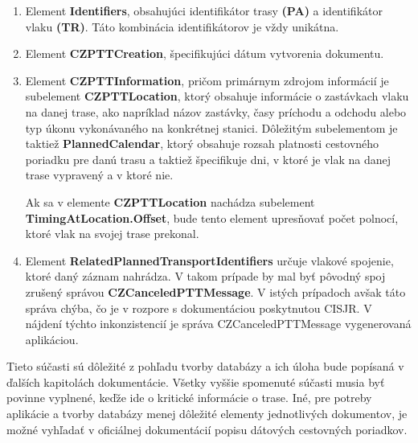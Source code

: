\documentclass[10pt,xcolor=pdflatex,dvipsnames,table,oneside]{book}
\begin{document}
\begin{enumerate}
    \item Element \textbf{Identifiers}, obsahujúci identifikátor trasy \textbf{(PA)} a identifikátor vlaku \textbf{(TR)}. Táto kombinácia identifikátorov je vždy unikátna.
    \item Element \textbf{CZPTTCreation}, špecifikujúci dátum vytvorenia dokumentu.
    \item Element \textbf{CZPTTInformation}, pričom primárnym zdrojom informácií je subelement \textbf{CZPTTLocation}, ktorý obsahuje informácie o zastávkach vlaku na danej trase, ako napríklad názov zastávky, časy príchodu a odchodu alebo typ úkonu vykonávaného na konkrétnej stanici. Dôležitým subelementom je taktiež \textbf{PlannedCalendar}, ktorý obsahuje rozsah platnosti cestovného poriadku pre danú trasu a taktiež špecifikuje dni, v ktoré je vlak na danej trase vypravený a v ktoré nie.
    \par Ak sa v elemente \textbf{CZPTTLocation} nachádza subelement \textbf{TimingAtLocation.Offset}, bude tento element upresňovať počet polnocí, ktoré vlak na svojej trase prekonal.
    \item Element \textbf{RelatedPlannedTransportIdentifiers} určuje vlakové spojenie, ktoré daný záznam nahrádza. V takom prípade by mal byť pôvodný spoj zrušený správou \textbf{CZCanceledPTTMessage}. V istých prípadoch avšak táto správa chýba, čo je v rozpore s dokumentáciou poskytnutou CISJR. V nájdení týchto inkonzistencií je správa CZCanceledPTTMessage vygenerovaná aplikáciou.
\end{enumerate}

\par Tieto súčasti sú dôležité z pohľadu tvorby databázy a ich úloha bude popísaná v ďalších kapitolách dokumentácie. Všetky vyššie spomenuté súčasti musia byť povinne vyplnené, keďže ide o kritické informácie o trase. Iné, pre potreby aplikácie a tvorby databázy menej dôležité elementy jednotlivých dokumentov, je možné vyhľadať v oficiálnej dokumentácií popisu dátových cestovných poriadkov.

\end{document}
